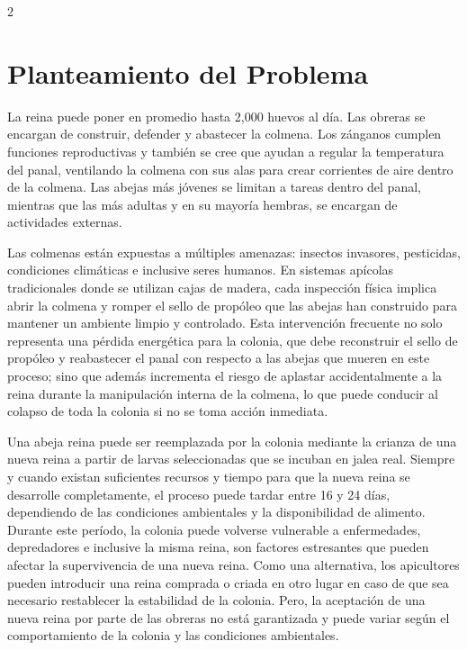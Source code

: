\documentclass[12pt]{report}
\newenvironment{tightmulticols}{%
  \begin{multicols}{2}
  \setlength{\parskip}{1.2pt}
  \linespread{1}\selectfont
}{%
  \end{multicols}
}
\begin{document}
\begin{tightmulticols}

\section{Planteamiento del Problema}

\noindent La reina puede poner en promedio hasta 2,000 huevos al día. Las obreras se encargan de construir, defender y abastecer la colmena\cite{winston1987temperate}. Los zánganos cumplen funciones reproductivas y también se cree que ayudan a regular la temperatura del panal, ventilando la colmena con sus alas para crear corrientes de aire dentro de la colmena. Las abejas más jóvenes se limitan a tareas dentro del panal, mientras que las más adultas y en su mayoría hembras, se encargan de actividades externas\cite{johnson2010division}.

\par Las colmenas están expuestas a múltiples amenazas: insectos invasores, pesticidas, condiciones climáticas e inclusive seres humanos. En sistemas apícolas tradicionales donde se utilizan cajas de madera, cada inspección física implica abrir la colmena y romper el sello de propóleo que las abejas han construido para mantener un ambiente limpio y controlado. Esta intervención frecuente no solo representa una pérdida energética para la colonia, que debe reconstruir el sello de propóleo y reabastecer el panal con respecto a las abejas que mueren en este proceso; sino que además incrementa el riesgo de aplastar accidentalmente a la reina durante la manipulación interna de la colmena, lo que puede conducir al colapso de toda la colonia si no se toma acción inmediata.

\par Una abeja reina puede ser reemplazada por la colonia mediante la crianza de una nueva reina a partir de larvas seleccionadas que se incuban en jalea real. Siempre y cuando existan suficientes recursos y tiempo para que la nueva reina se desarrolle completamente, el proceso puede tardar entre 16 y 24 días, dependiendo de las condiciones ambientales y la disponibilidad de alimento\cite{winston1987temperate}. Durante este período, la colonia puede volverse vulnerable a enfermedades, depredadores e inclusive la misma reina, son factores estresantes que pueden afectar la supervivencia de una nueva reina. Como una alternativa, los apicultores pueden introducir una reina comprada o criada en otro lugar en caso de que sea necesario restablecer la estabilidad de la colonia. Pero, la aceptación de una nueva reina por parte de las obreras no está garantizada y puede variar según el comportamiento de la colonia y las condiciones ambientales\cite{ruvinga2021}.


\end{tightmulticols}
\end{document}

